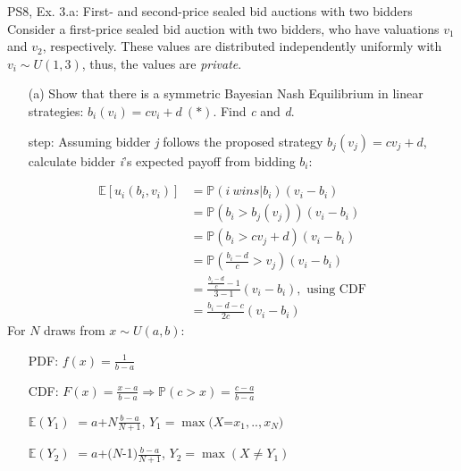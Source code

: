 \begin{frame}{PS8, Ex. 3.a: First- and second-price sealed bid auctions with two bidders}
    Consider a first-price sealed bid auction with two bidders, who have valuations $v_1$ and $v_2$, respectively. These values are distributed independently uniformly with $v_i\sim U(1,3)$, thus, the values are \textit{private}.
    \vspace{-4pt}
    \begin{itemize}
      \item[(a)] Show that there is a symmetric Bayesian Nash Equilibrium in linear strategies: $b_i(v_i) = cv_i + d\ (*)$. Find \textit{c} and \textit{d}.
    \end{itemize}
    \vspace{-8pt}
    \begin{multicols}{2}
      \begin{itemize}
        \item[\nth{1} step:] Assuming bidder \textit{j} follows the proposed strategy $b_j(v_j) = cv_j + d$, calculate bidder \textit{i}'s expected payoff from bidding $b_i$:
      \end{itemize}
      \vspace{-4pt}
      \begin{align*}
        \mathbb{E}[u_i(b_i,v_i)]&=\mathbb{P}(i\ wins|b_i)(v_i-b_i)\\
                                &=\mathbb{P}(b_i>b_j(v_j))(v_i-b_i)\\
                                &=\mathbb{P}(b_i>cv_j+d)(v_i-b_i)\\
                                &=\mathbb{P}\left(\frac{b_i-d}{c}>v_j\right)(v_i-b_i)\\
                                &=\frac{\frac{b_i-d}{c}-1}{3-1}(v_i-b_i),\text{ using CDF}\\
                                &=\frac{b_i-d-c}{2c}(v_i-b_i)
      \end{align*}
      \vfill\null\columnbreak
      For $N$ draws from $x\sim U(a, b):$
      \vspace{-6pt}
      \begin{enumerate}
        \item[PDF:] $f(x)=\frac{1}{b-a}$
        \item[CDF:] $F(x)=\frac{x-a}{b-a}\Rightarrow\mathbb{P}(c>x)=\frac{c-a}{b-a}$
        \item[$\mathbb{E}(Y_1)$] $=a$+$N\frac{b-a}{N+1}$, $Y_1=\max(X$=$x_1,..,x_N)$
        \item[$\mathbb{E}(Y_2)$] $=a$+$(N$-1$)\frac{b-a}{N+1}$, $Y_2=\max(X\neq Y_1)$
      \end{enumerate}
      \vfill\null
    \end{multicols}
\end{frame}
